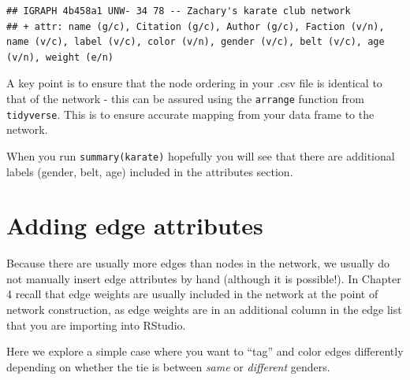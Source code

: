 \documentclass[
]{book}
\newenvironment{Shaded}{\begin{snugshade}}{\end{snugshade}}
\newcommand{\CommentTok}[1]{\textcolor[rgb]{0.56,0.35,0.01}{\textit{#1}}}
\newcommand{\FunctionTok}[1]{\textcolor[rgb]{0.13,0.29,0.53}{\textbf{#1}}}
\newcommand{\NormalTok}[1]{#1}
\newcommand{\OtherTok}[1]{\textcolor[rgb]{0.56,0.35,0.01}{#1}}
\newcommand{\SpecialCharTok}[1]{\textcolor[rgb]{0.81,0.36,0.00}{\textbf{#1}}}
\newcommand{\StringTok}[1]{\textcolor[rgb]{0.31,0.60,0.02}{#1}}
\begin{document}
\begin{verbatim}
## IGRAPH 4b458a1 UNW- 34 78 -- Zachary's karate club network
## + attr: name (g/c), Citation (g/c), Author (g/c), Faction (v/n), name (v/c), label (v/c), color (v/n), gender (v/c), belt (v/c), age (v/n), weight (e/n)
\end{verbatim}

A key point is to ensure that the node ordering in your .csv file is identical to that of the network - this can be assured using the \texttt{arrange} function from \texttt{tidyverse}. This is to ensure accurate mapping from your data frame to the network.

When you run \texttt{summary(karate)} hopefully you will see that there are additional labels (gender, belt, age) included in the attributes section.

\section{Adding edge attributes}\label{adding-edge-attributes}

Because there are usually more edges than nodes in the network, we usually do not manually insert edge attributes by hand (although it is possible!). In Chapter 4 recall that edge weights are usually included in the network at the point of network construction, as edge weights are in an additional column in the edge list that you are importing into RStudio.

Here we explore a simple case where you want to ``tag'' and color edges differently depending on whether the tie is between \emph{same} or \emph{different} genders.

\begin{Shaded}
\end{Shaded}
\end{document}

